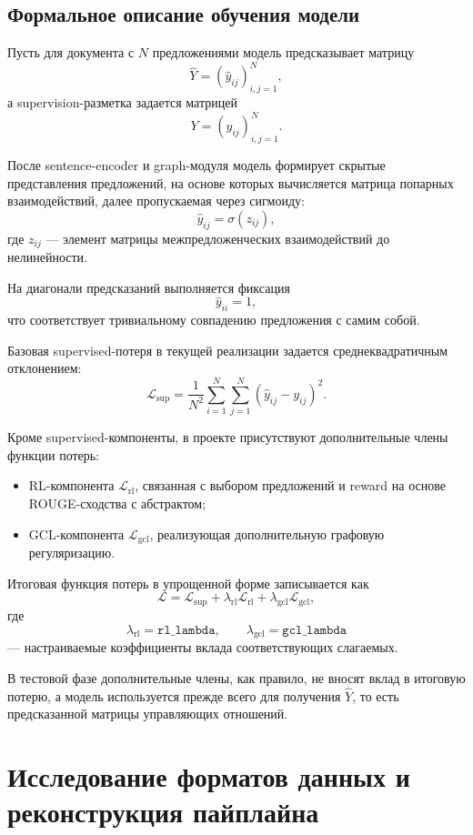 \documentclass[12pt,a4paper]{article}
\begin{document}
\subsection{Формальное описание обучения модели}

Пусть для документа с $N$ предложениями модель предсказывает матрицу
\[
\hat{Y} = (\hat{y}_{ij})_{i,j=1}^{N},
\]
а supervision-разметка задается матрицей
\[
Y = (y_{ij})_{i,j=1}^{N}.
\]

После sentence-encoder и graph-модуля модель формирует скрытые представления предложений,
на основе которых вычисляется матрица попарных взаимодействий, далее пропускаемая через
сигмоиду:
\[
\hat{y}_{ij} = \sigma(z_{ij}),
\]
где $z_{ij}$ --- элемент матрицы межпредложенческих взаимодействий до нелинейности.

На диагонали предсказаний выполняется фиксация
\[
\hat{y}_{ii} = 1,
\]
что соответствует тривиальному совпадению предложения с самим собой.

Базовая supervised-потеря в текущей реализации задается среднеквадратичным отклонением:
\[
\mathcal{L}_{\text{sup}} =
\frac{1}{N^2}\sum_{i=1}^{N}\sum_{j=1}^{N}
\left(\hat{y}_{ij} - y_{ij}\right)^2.
\]

Кроме supervised-компоненты, в проекте присутствуют дополнительные члены функции потерь:

\begin{itemize}
    \item RL-компонента $\mathcal{L}_{\text{rl}}$, связанная с выбором предложений и
    reward на основе ROUGE-сходства с абстрактом;
    \item GCL-компонента $\mathcal{L}_{\text{gcl}}$, реализующая дополнительную графовую
    регуляризацию.
\end{itemize}

Итоговая функция потерь в упрощенной форме записывается как
\[
\mathcal{L} =
\mathcal{L}_{\text{sup}}
+ \lambda_{\text{rl}} \mathcal{L}_{\text{rl}}
+ \lambda_{\text{gcl}} \mathcal{L}_{\text{gcl}},
\]
где
\[
\lambda_{\text{rl}} = \texttt{rl\_lambda}, \qquad
\lambda_{\text{gcl}} = \texttt{gcl\_lambda}
\]
--- настраиваемые коэффициенты вклада соответствующих слагаемых.

В тестовой фазе дополнительные члены, как правило, не вносят вклад в итоговую потерю, а
модель используется прежде всего для получения $\hat{Y}$, то есть предсказанной матрицы
управляющих отношений.

\section{Исследование форматов данных и реконструкция пайплайна}
\end{document}
